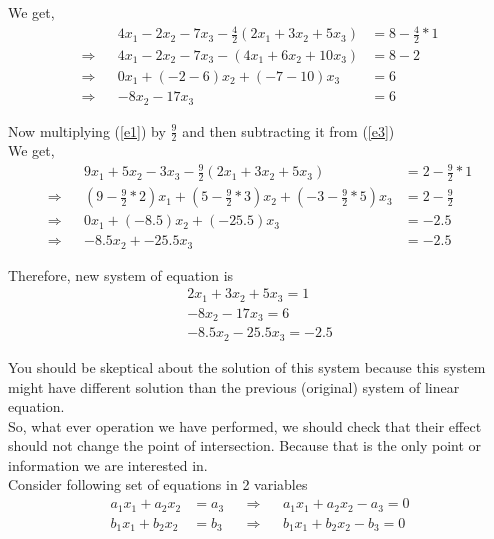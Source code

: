 \documentclass{article}
\begin{document}
We get,
\begin{align}
    && 4x_1 - 2x_2 - 7x_3 - \frac{4}{2}(2x_1 + 3x_2 + 5x_3) &= 8 - \frac{4}{2}*1\nonumber \\
    \Rightarrow && 4x_1 - 2x_2 - 7x_3 - (4x_1 + 6x_2 + 10x_3) &= 8 - 2\nonumber \\
    \Rightarrow && 0x_1 + (-2-6)x_2 + (-7-10)x_3 &= 6\nonumber \\
    \Rightarrow && -8x_2 - 17x_3 &= 6 \nonumber
\end{align}

Now multiplying (\ref{e1}) by \(\frac{9}{2}\) and then subtracting it from (\ref{e3})\\
We get,
\begin{align}
    && 9x_1 + 5x_2 - 3x_3 - \frac{9}{2}(2x_1 + 3x_2 + 5x_3) &= 2 - \frac{9}{2}*1 \nonumber \\
    \Rightarrow && (9 - \frac{9}{2}*2)x_1 + (5 - \frac{9}{2}*3)x_2 + (-3 -\frac{9}{2}*5)x_3 &= 2 - \frac{9}{2}\nonumber \\
    \Rightarrow && 0x_1 + (-8.5)x_2 + (-25.5)x_3 &= -2.5\nonumber \\
    \Rightarrow && -8.5x_2 + -25.5x_3 &= -2.5 \nonumber
\end{align}

Therefore, new system of equation is
\begin{align}
    2x_1 +3x_2 +5x_3 =1 \nonumber \\
    -8x_2 -17x_3 =6 \nonumber \\
    -8.5x_2 -25.5x_3 =-2.5 \nonumber 
\end{align}

You should be skeptical about the solution of this system because this system might have different solution than the previous (original) system of linear equation.\\

So, what ever operation we have performed, we should check that their effect should not change the point of intersection. Because that is the only point or information we are interested in.\\

Consider following set of equations in 2 variables
\begin{align}
    a_1x_1 + a_2x_2 &= a_3 && \Rightarrow && a_1x_1 + a_2x_2 - a_3 = 0 \\
    b_1x_1 + b_2x_2 &= b_3 && \Rightarrow && b_1x_1 + b_2x_2 - b_3 = 0
\end{align}
\end{document}

